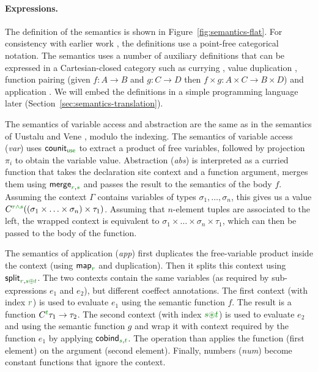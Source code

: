 \paragraph{Expressions.}
The definition of the semantics is shown in Figure~\ref{fig:semantics-flat}. For consistency
with earlier work \cite{comonads-notions,comonads-dom-thesis}, the definitions use a point-free
categorical notation. The semantics uses a number of auxiliary definitions that can be expressed
in a Cartesian-closed category such as currying , value duplication ,
function pairing (given $f:A\rightarrow B$ and $g:C\rightarrow D$ then $f\times g : A\times C \rightarrow B \times D$)
and application . We will embed the definitions in a simple programming language
later (Section~\ref{sec:semantics-translation}).

The semantics of variable access and abstraction are the same as in the semantics of Uustalu and
Vene \cite{comonads-notions}, modulo the indexing. The semantics of variable access (\emph{var}) uses
$\ident{counit}_{\cunit}$ to extract a product of free variables, followed by projection
$\pi_i$ to obtain the variable value. Abstraction (\emph{abs}) is interpreted as a curried
function that takes the declaration site context and a function argument, merges them using
$\ident{merge}_{\cclrd{r}, \cclrd{s}}$ and passes the result to the semantics of the body $f$.
Assuming the context $\Gamma$ contains variables of types $\sigma_1, \ldots, \sigma_n$, this gives
us a value $\ctyp{\cclrd{r}\czip\cclrd{s}}((\sigma_1 \times \ldots \times \sigma_n) \times \tau_1)$.
Assuming that $n$-element tuples are associated to the left, the wrapped context is equivalent to
$\sigma_1 \times \ldots \times \sigma_n \times \tau_1$, which can then be passed to the body of the
function.

The semantics of application (\emph{app}) first duplicates the free-variable product inside the
context (using $\ident{map}_{\cclrd{r}}$ and duplication). Then it splits this context using
$\ident{split}_{\cclrd{r}, \cclrd{s} \cpar \cclrd{t}}$. The two contexts contain the same variables
(as required by sub-expressions $e_1$ and $e_2$), but different coeffect annotations. The first
context (with index $\cclrd{r}$) is used to evaluate $e_1$ using the semantic function $f$. The
result is a function $\ctyp{\cclrd{t}}{\tau_1} \rightarrow \tau_2$. The second context
(with index $\cclrd{s}\cseq\cclrd{t}$) is used to evaluate $e_2$ and using the semantic function $g$
and wrap it with context required by the function $e_1$ by applying $\ident{cobind}_{\cclrd{s}, \cclrd{t}}$.
The  operation than applies the function (first element) on the argument (second element).
Finally, numbers (\emph{num}) become constant functions that ignore the context.

